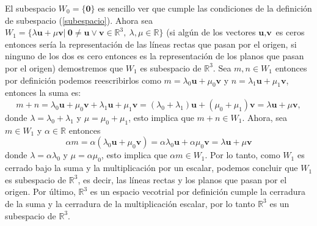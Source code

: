 \documentclass[11pt,letterpaper]{article}
\newcommand{\mR}{\mathbb{R}}
\begin{document}
\begin{enumerate}
El subespacio $W_0=\{\textbf{0}\}$ es sencillo ver que cumple las condiciones de la definición de subespacio (\ref{subespacio}). Ahora sea $W_1=\{ \lambda \textbf{u} + \mu \textbf{v}|\ \textbf{0} \neq\textbf{u}\vee \textbf{v}\in \mR^3,\  \lambda,\mu \in \mR \}$ (si algún de los vectores $\textbf{u},\textbf{v}$ es ceros entonces sería la representación de las líneas rectas que pasan por el origen, si ninguno de los dos es cero entonces es la representación de los planos que pasan por el origen) demostremos que $W_1$ es subespacio de $\mR^3$. Sea $m,n\in W_1$ entonces por definición podemos reescribirlos como $m=\lambda_0\textbf{u}+\mu_0\textbf{v}$ y $n=\lambda_1\textbf{u}+\mu_1\textbf{v}$, entonces la suma es:
$$m+n=\lambda_0\textbf{u}+\mu_0\textbf{v}+\lambda_1\textbf{u}+\mu_1\textbf{v}=(\lambda_0+\lambda_1)\textbf{u}+(\mu_0+\mu_1)\textbf{v}=\lambda\textbf{u}+\mu\textbf{v}, $$
donde $\lambda=\lambda_0+\lambda_1$ y $\mu=\mu_0+\mu_1$, esto implica que $m+n\in W_1$. Ahora, sea $m\in W_1$ y $\alpha\in \mR$ entonces
$$\alpha m=\alpha(\lambda_0\textbf{u}+\mu_0\textbf{v})=\alpha\lambda_0\textbf{u}+\alpha\mu_0\textbf{v}=\lambda\textbf{u}+\mu\textbf{v}$$
donde $\lambda=\alpha\lambda_0$ y $\mu=\alpha\mu_0$, esto implica que $\alpha m\in W_1.$ Por lo tanto, como $W_1$ es cerrado bajo la suma y la multiplicación por un escalar, podemos concluir que $W_1$ es subespacio de $\mR^3$, es decir, las líneas rectas y los planos que pasan por el origen. Por último, $\mR^3$ es un espacio vecotrial por definición cumple la cerradura de la suma y la cerradura de la multiplicación escalar, por lo tanto $\mR^3$ es un subespacio de $\mR^3$.\\


\end{enumerate}
\end{document}
